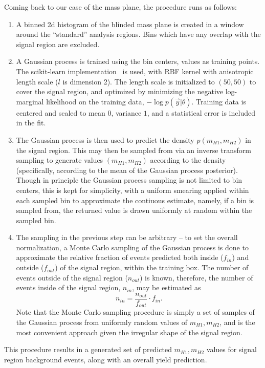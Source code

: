 Coming back to our case of the mass plane, the procedure runs as follows:
\begin{enumerate}
	\item A binned 2d histogram of the blinded mass plane is created in a window 
	around the ``standard'' analysis regions. Bins which have any overlap with the 
	signal region are excluded.
	\item A Gaussian process is trained using the bin centers, values as training points. 
	The scikit-learn implementation~\cite{scikit-learn} is used, with RBF kernel with anisotropic length scale 
	($l$ is dimension 2).  The length scale is initialized to $(50, 50)$ to cover the signal region, 
	and optimized by minimizing the negative log-marginal likelihood on the training data, 
	$-\log p(\vec{y}|\theta)$. Training data is centered and scaled to mean $0$, variance $1$, 
	and a statistical error is included in the fit.
	\item The Gaussian process is then used to predict the density $p(m_{H1}, m_{H2})$ in the signal region. 
	This may then be sampled from via an inverse transform sampling to generate values $(m_{H1}, m_{H2})$ 
	according to the density (specifically, according to the mean of the Gaussian process posterior). 
	Though in principle the Gaussian process sampling is not limited 
	to bin centers, this is kept for simplicity, with a uniform smearing applied within each 
	sampled bin to approximate the contiuous estimate, namely, if a bin is sampled from, the 
	returned value is drawn uniformly at random within the sampled bin. 
	\item The sampling in the previous step can be arbitrary -- to set the overall normalization, 
	a Monte Carlo sampling of the Gaussian process is done to approximate the relative fraction 
	of events predicted both inside ($f_{in}$) and outside ($f_{out}$) of the signal region, within 
	the training box. The number of events outside of the signal region ($n_{out}$) is known, therefore, 
	the number of events inside of the signal region, $n_{in}$, may be estimated as 
	\begin{equation}
	n_{in} = \frac{n_{out}}{f_{out}}\cdot f_{in}.
	\end{equation}
	Note that the Monte Carlo sampling procedure is simply a set of samples of the Gaussian 
	process from uniformly random values of $m_{H1}, m_{H2}$, and is the most convenient 
	approach given the irregular shape of the signal region.
\end{enumerate}
This procedure results in a generated set of predicted $m_{H1}, m_{H2}$ values for signal region
background events, along with an overall yield prediction.

